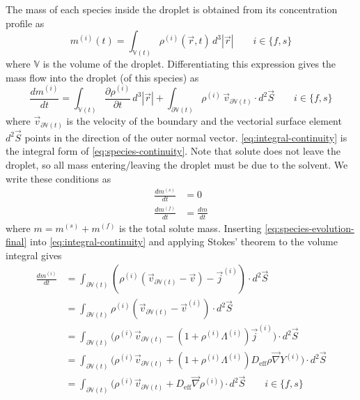 \documentclass[12pt,twoside]{report}
\begin{document}
The mass of each species inside the droplet is obtained from its concentration profile as
\begin{equation}
  m^{(i)}(t) = \int_{\mathbb{V}(t)} \rho^{(i)}(\vec{r},t) \, d^3|\vec{r}|
  \qquad i \in \{f,s\}
\end{equation}
where $\mathbb{V}$ is the volume of the droplet.
Differentiating this expression gives the mass flow into the droplet (of this species) as
\begin{equation}\label{eq:integral-continuity}
  \frac{d m^{(i)}}{dt} =
  \int_{\mathbb{V}(t)} \frac{\partial \rho^{(i)}}{\partial t} \, d^3|\vec{r}| +
  \int_{\partial \mathbb{V}(t)} \rho^{(i)} \, \vec{v}_{\partial \mathbb{V}(t)} \cdot d^2\vec{S}
  \qquad i \in \{f,s\}
\end{equation}
where $\vec{v}_{\partial \mathbb{V}(t)}$ is the velocity of the boundary and the vectorial surface element $d^2\vec{S}$ points in the direction of the outer normal vector.
\eqref{eq:integral-continuity} is the integral form of \eqref{eq:species-continuity}.
Note that solute does not leave the droplet, so all mass entering/leaving the droplet must be due to the solvent.
We write these conditions as
\begin{subequations}
  \begin{align}
    \frac{d m^{(s)}}{dt} &= 0 \\
    \frac{d m^{(f)}}{dt} &= \frac{d m}{dt}
  \end{align}
\end{subequations}
where $m = m^{(s)} + m^{(f)}$ is the total solute mass.
Inserting \eqref{eq:species-evolution-final} into \eqref{eq:integral-continuity} and applying Stokes' theorem to the volume integral gives
\begin{equation}
  \begin{aligned}
    \frac{d m^{(i)}}{dt} &=
    \int_{\partial \mathbb{V}(t)}
    (\rho^{(i)} (\vec{v}_{\partial \mathbb{V}(t)} - \vec{v}) - \vec{j}^{(i)})
    \cdot d^2\vec{S} \\
    &=
    \int_{\partial \mathbb{V}(t)}
    \rho^{(i)} (\vec{v}_{\partial \mathbb{V}(t)} - \vec{v}^{(i)})
    \cdot d^2\vec{S} \\
    &=
    \int_{\partial \mathbb{V}(t)}
    \Big(
    \rho^{(i)} \vec{v}_{\partial \mathbb{V}(t)} -
    (1 + \rho^{(i)} \Lambda^{(i)}) \vec{j}^{(i)}
    \Big)
    \cdot d^2\vec{S} \\
    &=
    \int_{\partial \mathbb{V}(t)}
    \Big(
    \rho^{(i)} \vec{v}_{\partial \mathbb{V}(t)} +
    (1 + \rho^{(i)} \Lambda^{(i)})
    D_{\textrm{eff}} \rho \vec{\nabla} Y^{(i)}
    \Big)
    \cdot d^2\vec{S} \\
    &=
    \int_{\partial \mathbb{V}(t)}
    \Big(
    \rho^{(i)} \vec{v}_{\partial \mathbb{V}(t)} +
    D_{\textrm{eff}} \vec{\nabla} \rho^{(i)}
    \Big)
    \cdot d^2\vec{S}
    \qquad i \in \{f,s\}
  \end{aligned}
\end{equation}
\end{document}
